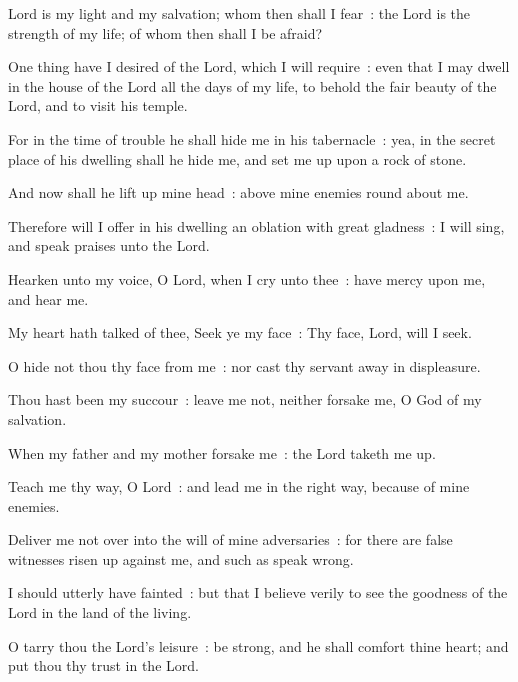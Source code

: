  Lord is my light and my salvation; whom then shall I fear~: the Lord is the strength of my life; of whom then shall I be afraid?\par
{}
One thing have I desired of the Lord, which I will require~: even that I may dwell in the house of the Lord all the days of my life, to behold the fair beauty of the Lord, and to visit his temple.\par
{}For in the time of trouble he shall hide me in his tabernacle~: yea, in the secret place of his dwelling shall he hide me, and set me up upon a rock of stone.\par
{}And now shall he lift up mine head~: above mine enemies round about me.\par
{}Therefore will I offer in his dwelling an oblation with great gladness~: I will sing, and speak praises unto the Lord.\par
{}Hearken unto my voice, O Lord, when I cry unto thee~: have mercy upon me, and hear me.\par
{}My heart hath talked of thee, Seek ye my face~: Thy face, Lord, will I seek.\par
{}O hide not thou thy face from me~: nor cast thy servant away in displeasure.\par
{}Thou hast been my succour~: leave me not, neither forsake me, O God of my salvation.\par
{}When my father and my mother forsake me~: the Lord taketh me up.\par
{}Teach me thy way, O Lord~: and lead me in the right way, because of mine enemies.\par
{}Deliver me not over into the will of mine adversaries~: for there are false witnesses risen up against me, and such as speak wrong.\par
{}I should utterly have fainted~: but that I believe verily to see the goodness of the Lord in the land of the living.\par
{}O tarry thou the Lord's leisure~: be strong, and he shall comfort thine heart; and put thou thy trust in the Lord.\par

